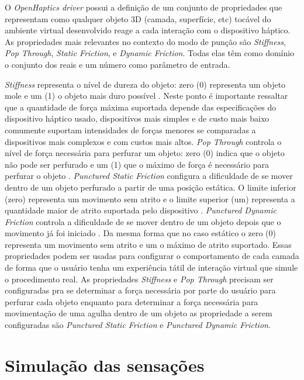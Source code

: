O \textit{OpenHaptics driver} possui a definição de um conjunto de propriedades que representam como qualquer objeto 3D (camada, superfície, etc) tocável do ambiente virtual desenvolvido reage a cada interação com o dispositivo háptico. As propriedades mais relevantes no contexto do modo de punção são \textit{Stiffness}, \textit{Pop Through}, \textit{Static Friction}, e \textit{Dynamic Friction}. Todas elas têm como domínio o conjunto dos reais e um número como parâmetro de entrada. 

\textit{Stiffness} representa o nível de dureza do objeto: zero (0) representa um objeto mole e um (1) o objeto mais duro possível \cite{3DSystemsTouch2018}. Neste ponto é importante ressaltar que a quantidade de força máxima suportada depende das especificações do dispositivo háptico usado, dispositivos mais simples e de custo mais baixo comumente suportam intensidades de forças menores se comparadas a dispositivos mais complexos e com custos mais altos. \textit{Pop Through} controla o nível de força necessária para perfurar um objeto: zero (0) indica que o objeto não pode ser perfurado e um (1) que o máximo de força é necessário para perfurar o objeto \cite{3DSystemsTouch2018}. \textit{Punctured Static Friction} configura a dificuldade de se mover dentro de um objeto perfurado a partir de uma posição estática. O limite inferior (zero) representa um movimento sem atrito e o limite superior (um) representa a quantidade maior de atrito suportada pelo dispositivo \cite{3DSystemsTouch2018}. \textit{Punctured Dynamic Friction} controla a dificuldade de se mover dentro de um objeto depois que o movimento já foi iniciado \cite{3DSystemsTouch2018}. Da mesma forma que no caso estático o zero (0) representa um movimento sem atrito e um o máximo de atrito suportado. Essas propriedades podem ser usadas para configurar o comportamento de cada camada de forma que o usuário tenha um experiência tátil de interação virtual que simule o procedimento real. As propriedades \textit{Stiffness} e \textit{Pop Through} precisam ser configuradas pra se determinar a força necessária por parte do usuário para perfurar cada objeto enquanto para determinar a força necessária para movimentação de uma agulha dentro de um objeto as propriedade a serem configuradas são \textit{Punctured Static Friction} e \textit{Punctured Dynamic Friction}.

\section{Simulação das sensações}
\label{sec:testeSensacoes}


